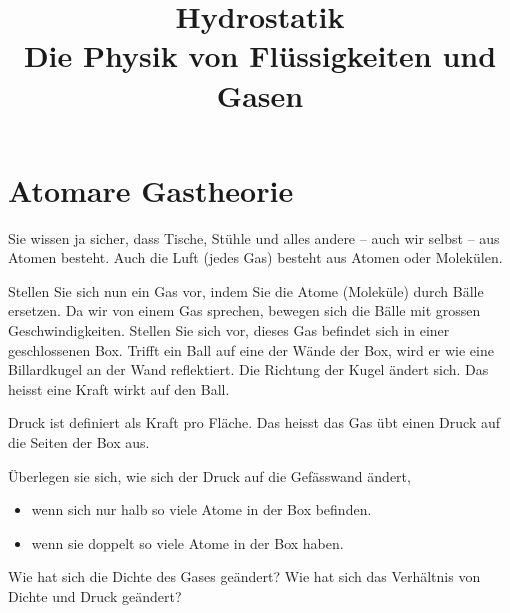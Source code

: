 \documentclass[12pt,a5paper,landscape]{article}
\date{}
\title{Hydrostatik\\{\large Die Physik von Flüssigkeiten und Gasen}}
\begin{document}
\section*{Atomare Gastheorie}

Sie wissen ja sicher, dass Tische, Stühle und alles andere -- auch wir selbst -- aus Atomen besteht.
Auch die Luft (jedes Gas) besteht aus Atomen oder Molekülen.

Stellen Sie sich nun ein Gas vor, indem Sie die Atome (Moleküle) durch Bälle ersetzen.
Da wir von einem Gas sprechen, bewegen sich die Bälle mit grossen Geschwindigkeiten.
Stellen Sie sich vor, dieses Gas befindet sich in einer geschlossenen Box.
Trifft ein Ball auf eine der Wände der Box, wird er wie eine Billardkugel an der Wand reflektiert.
Die Richtung der Kugel ändert sich. Das heisst eine Kraft wirkt auf den Ball.

Druck ist definiert als Kraft pro Fläche. Das heisst das Gas übt einen Druck auf die Seiten der Box aus.

Überlegen sie sich, wie sich der Druck auf die Gefässwand ändert, 
\begin{itemize}
	\item wenn sich nur halb so viele Atome in der Box befinden.
	\item wenn sie doppelt so viele Atome in der Box haben.
\end{itemize}

Wie hat sich die Dichte des Gases geändert?
Wie hat sich das Verhältnis von Dichte und Druck geändert?
\end{document}
